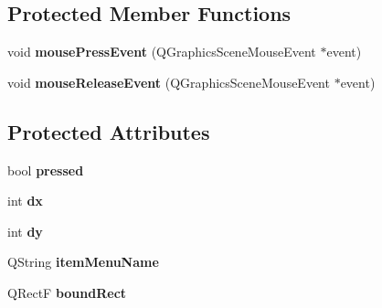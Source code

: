 \subsection*{Protected Member Functions}
\begin{DoxyCompactItemize}
\item 
void {\bfseries mouse\+Press\+Event} (Q\+Graphics\+Scene\+Mouse\+Event $\ast$event)\hypertarget{class_menu_item_graphics_object_a6f291090f45fc75a171ae55a09fd4f3d}{}\label{class_menu_item_graphics_object_a6f291090f45fc75a171ae55a09fd4f3d}

\item 
void {\bfseries mouse\+Release\+Event} (Q\+Graphics\+Scene\+Mouse\+Event $\ast$event)\hypertarget{class_menu_item_graphics_object_addbf1e6b7247679ccf8b31f6a885f6e6}{}\label{class_menu_item_graphics_object_addbf1e6b7247679ccf8b31f6a885f6e6}

\end{DoxyCompactItemize}
\subsection*{Protected Attributes}
\begin{DoxyCompactItemize}
\item 
bool {\bfseries pressed}\hypertarget{class_menu_item_graphics_object_ac8a4aab9ad0917b4f4270225a7ecbb58}{}\label{class_menu_item_graphics_object_ac8a4aab9ad0917b4f4270225a7ecbb58}

\item 
int {\bfseries dx}\hypertarget{class_menu_item_graphics_object_aba38dc2a531e530d08f2aa92544f3104}{}\label{class_menu_item_graphics_object_aba38dc2a531e530d08f2aa92544f3104}

\item 
int {\bfseries dy}\hypertarget{class_menu_item_graphics_object_a9b7f14de2c2e5ff71aad8a6ab729ef1d}{}\label{class_menu_item_graphics_object_a9b7f14de2c2e5ff71aad8a6ab729ef1d}

\item 
Q\+String {\bfseries item\+Menu\+Name}\hypertarget{class_menu_item_graphics_object_a6ed305de3a3718503a5e3dabdbc07786}{}\label{class_menu_item_graphics_object_a6ed305de3a3718503a5e3dabdbc07786}

\item 
Q\+RectF {\bfseries bound\+Rect}\hypertarget{class_menu_item_graphics_object_ae78d7732b7108406484238c3814bb1e6}{}\label{class_menu_item_graphics_object_ae78d7732b7108406484238c3814bb1e6}

\end{DoxyCompactItemize}


